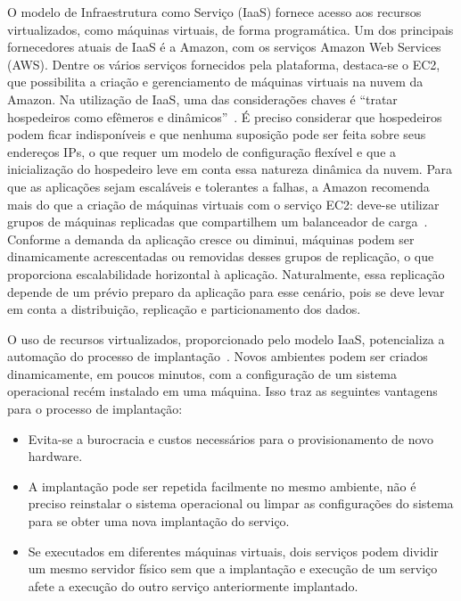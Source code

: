 O modelo de Infraestrutura como Serviço (IaaS) fornece acesso aos recursos virtualizados, como máquinas virtuais, de forma programática. Um dos principais fornecedores atuais de IaaS é a Amazon, com os serviços Amazon Web Services (AWS). Dentre os vários serviços fornecidos pela plataforma, destaca-se o EC2, que possibilita a criação e gerenciamento de máquinas virtuais na nuvem da Amazon. Na utilização de IaaS, uma das considerações chaves é ``tratar hospedeiros como efêmeros e dinâmicos''~\cite{Amazon2012Practices}. É preciso considerar que hospedeiros podem ficar indisponíveis e que nenhuma suposição pode ser feita sobre seus endereços IPs, o que requer um modelo de configuração flexível e que a inicialização do hospedeiro leve em conta essa natureza dinâmica da nuvem. Para que as aplicações sejam escaláveis e tolerantes a falhas, a Amazon recomenda mais do que a criação de máquinas virtuais com o serviço EC2: deve-se utilizar grupos de máquinas replicadas que compartilhem um balanceador de carga~\cite{Amazon2012Practices}. Conforme a demanda da aplicação cresce ou diminui, máquinas podem ser dinamicamente acrescentadas ou removidas desses grupos de replicação, o que proporciona escalabilidade horizontal à aplicação. Naturalmente, essa replicação depende de um prévio preparo da aplicação para esse cenário, pois se deve levar em conta a distribuição, replicação e particionamento dos dados. 

O uso de recursos virtualizados, proporcionado pelo modelo IaaS,
potencializa a automação do processo de implantação~\cite{Humble2011Continuous}.
Novos ambientes podem ser criados dinamicamente, em poucos minutos,
com a configuração de um sistema operacional recém instalado em uma máquina.
Isso traz as seguintes vantagens para o processo de implantação:

\begin{itemize}
\item Evita-se a burocracia e custos necessários para o provisionamento de novo hardware.
\item A implantação pode ser repetida facilmente no mesmo ambiente, não é preciso reinstalar o sistema operacional ou limpar as configurações do sistema para se obter uma nova implantação do serviço.
\item Se executados em diferentes máquinas virtuais, dois serviços podem dividir um mesmo servidor físico sem que a implantação e execução de um serviço afete a execução do outro serviço anteriormente implantado.
\end{itemize}

